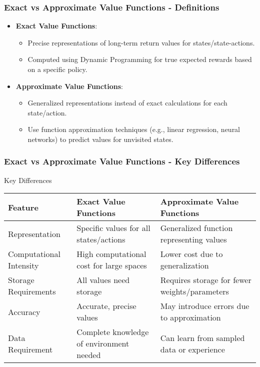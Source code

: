 \documentclass[aspectratio=169]{beamer}
\begin{document}
\begin{frame}[fragile]
    \frametitle{Exact vs Approximate Value Functions - Definitions}
    \begin{itemize}
        \item \textbf{Exact Value Functions}: 
        \begin{itemize}
            \item Precise representations of long-term return values for states/state-actions.
            \item Computed using Dynamic Programming for true expected rewards based on a specific policy.
        \end{itemize}
        
        \item \textbf{Approximate Value Functions}:
        \begin{itemize}
            \item Generalized representations instead of exact calculations for each state/action.
            \item Use function approximation techniques (e.g., linear regression, neural networks) to predict values for unvisited states.
        \end{itemize}
    \end{itemize}
\end{frame}

\begin{frame}[fragile]
    \frametitle{Exact vs Approximate Value Functions - Key Differences}
    \begin{block}{Key Differences}
        \begin{tabular}{|l|l|l|}
            \hline
            \textbf{Feature} & \textbf{Exact Value Functions} & \textbf{Approximate Value Functions} \\
            \hline
            Representation & Specific values for all states/actions & Generalized function representing values \\
            \hline
            Computational Intensity & High computational cost for large spaces & Lower cost due to generalization \\
            \hline
            Storage Requirements & All values need storage & Requires storage for fewer weights/parameters \\
            \hline
            Accuracy & Accurate, precise values & May introduce errors due to approximation \\
            \hline
            Data Requirement & Complete knowledge of environment needed & Can learn from sampled data or experience \\
            \hline
        \end{tabular}
    \end{block}
\end{frame}
\end{document}
